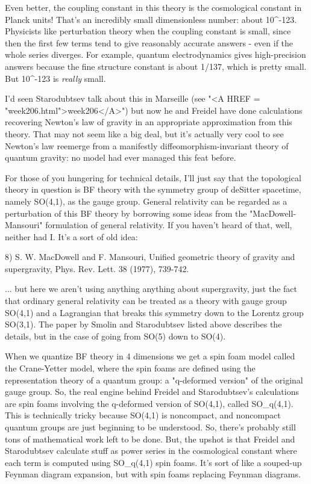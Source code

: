 Even better, the coupling constant in this theory is the cosmological 
constant in Planck units!  That's an incredibly small dimensionless 
number: about 10^{-123}.  Physicists like perturbation theory when the 
coupling constant is small, since then the first few terms tend to give 
reasonably accurate answers - even if the whole series diverges.  
For example, quantum electrodynamics gives high-precision answers
because the fine structure constant is about 1/137, which is pretty
small.  But 10^{-123} is \emph{really} small.

I'd seen Starodubtsev talk about this in Marseille (see "<A HREF = "week206.html">week206</A>")
but now he and Freidel have done calculations recovering Newton's
law of gravity in an appropriate approximation from this theory.  
That may not seem like a big deal, but it's actually very cool to see 
Newton's law reemerge from a manifestly diffeomorphism-invariant 
theory of quantum gravity: no model had ever managed this feat before.  

For those of you hungering for technical details, I'll just say that
the topological theory in question is BF theory with the symmetry group
of deSitter spacetime, namely SO(4,1), as the gauge group.  General 
relativity can be regarded as a perturbation of this BF theory by 
borrowing some ideas from the "MacDowell-Mansouri" formulation of 
general relativity.  If you haven't heard of that, well, neither had I.  
It's a sort of old idea:

8) S. W. MacDowell and F. Mansouri, Unified geometric theory of gravity
and supergravity, Phys. Rev. Lett. 38 (1977), 739-742. 

... but here we aren't using anything anything about supergravity,
just the fact that ordinary general relativity can be treated as a
theory with gauge group SO(4,1) and a Lagrangian that breaks this 
symmetry down to the Lorentz group SO(3,1).  The paper by Smolin and
Starodubtsev listed above describes the details, but in the case of
going from SO(5) down to SO(4).  

When we quantize BF theory in 4 dimensions we get a spin foam model
called the Crane-Yetter model, where the spin foams are defined using
the representation theory of a quantum group: a "q-deformed version" of 
the original gauge group.  So, the real engine behind Freidel and 
Starodubtsev's calculations are spin foams involving the q-deformed 
version of SO(4,1), called SO_{q}(4,1).  This is technically tricky 
because SO(4,1) is noncompact, and noncompact quantum groups are just 
beginning to be understood.  So, there's probably still tons of 
mathematical work left to be done.  But, the upshot is that Freidel 
and Starodubtsev calculate stuff as power series in the cosmological 
constant where each term is computed using SO_{q}(4,1) spin foams.  
It's sort of like a souped-up Feynman diagram expansion, but with spin foams 
replacing Feynman diagrams.

